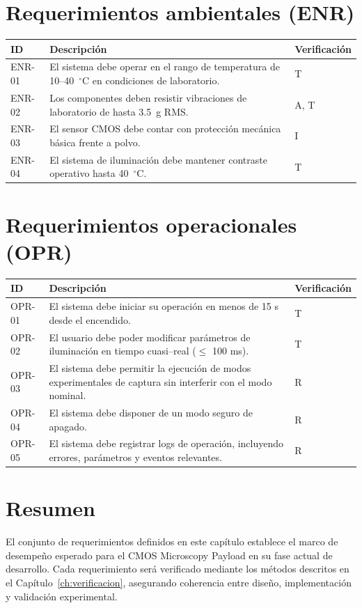 \section{Requerimientos ambientales (ENR)}
\renewcommand{\arraystretch}{1.3}

\begin{longtable}{p{1.2cm} p{10.3cm} p{2.5cm}}
\toprule
\textbf{ID} & \textbf{Descripción} & \textbf{Verificación} \\
\midrule
ENR-01 & El sistema debe operar en el rango de temperatura de 10--40~$^\circ$C en
condiciones de laboratorio. & T \\
ENR-02 & Los componentes deben resistir vibraciones de laboratorio de hasta
3.5~g RMS. & A, T \\
ENR-03 & El sensor CMOS debe contar con protección mecánica básica frente a polvo. & I \\
ENR-04 & El sistema de iluminación debe mantener contraste operativo hasta
40~$^\circ$C. & T \\
\bottomrule
\end{longtable}
\renewcommand{\arraystretch}{1}

\section{Requerimientos operacionales (OPR)}
\renewcommand{\arraystretch}{1.3}

\begin{longtable}{p{1.2cm} p{10.3cm} p{2.5cm}}
\toprule
\textbf{ID} & \textbf{Descripción} & \textbf{Verificación} \\
\midrule
OPR-01 & El sistema debe iniciar su operación en menos de 15 s desde el
encendido. & T \\
OPR-02 & El usuario debe poder modificar parámetros de iluminación en tiempo
cuasi--real ($\leq$ 100 ms). & T \\
OPR-03 & El sistema debe permitir la ejecución de modos experimentales de captura
sin interferir con el modo nominal. & R \\
OPR-04 & El sistema debe disponer de un modo seguro de apagado. & R \\
OPR-05 & El sistema debe registrar logs de operación, incluyendo errores,
parámetros y eventos relevantes. & R \\
\bottomrule
\end{longtable}
\renewcommand{\arraystretch}{1}

\section{Resumen}

El conjunto de requerimientos definidos en este capítulo establece el marco de
desempeño esperado para el CMOS Microscopy Payload en su fase actual de
desarrollo. Cada requerimiento será verificado mediante los métodos descritos en
el Capítulo~\ref{ch:verificacion}, asegurando coherencia entre diseño,
implementación y validación experimental.
